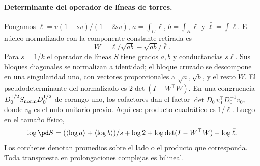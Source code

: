\paragraph{Determinante del operador de líneas de torres.}
Pongamos $\ell=v(1-sv)/(1-2sv)$, $a=\int_C\ell$, $b=\int_R\ell$ y $\bar\ell=\int\ell$.
El núcleo normalizado con la componente constante retirada es
\[
 W=\ell/\sqrt{ab}-\sqrt{ab}/\bar\ell .
\]
Para $s=1/k$ el operador de líneas $S$ tiene grados $a,b$ y conductancias $s\ell$.
Sus bloques diagonales se normalizan a identidad; el bloque cruzado se descompone en
una singularidad uno, con vectores proporcionales a $\sqrt a,\sqrt b$, y el resto $W$.
El pseudodeterminante del normalizado es $2\det(I-W^\top W)$.
En una congruencia $D_0^{1/2} S_{\rm norm}D_0^{1/2}$ de corango uno, los cofactores
dan el factor $\det D_0\,v_0^\top D_0^{-1}v_0$, donde $v_0$ es el nulo unitario previo.
Aquí ese producto cuadrático es $1/\bar\ell$. Luego en el tamaño físico,
\[
 \log\pd S=(\langle\log a\rangle+\langle\log b\rangle)/s+
 \log2+\log\det(I-W^\top W)-\log\bar\ell .
\]
Los corchetes denotan promedios sobre el lado o el producto que corresponda.
Toda transpuesta en prolongaciones complejas es bilineal.
